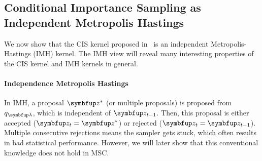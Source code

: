 %
\subsection{Conditional Importance Sampling as Independent Metropolis Hastings}\label{section:cis_imh}
We now show that the CIS kernel proposed in~\citep{NEURIPS2020_b2070693} is an independent Metropolis-Hastings (IMH) kernel.
The IMH view will reveal many interesting properties of the CIS kernel and IMH kernels in general.

\paragraph{Independence Metropolis Hastings}
In IMH, a proposal \(\vz^*\) (or multiple proposals) is proposed from \(q_{\vlambda}\), which is independent of \(\vz_{t-1}\).
Then, this proposal is either accepted (\(\vz_{t} = \vz^*\)) or rejected (\(\vz_{t} = \vz_{t-1}\)).
Multiple consecutive rejections means the sampler gets stuck, which often results in bad statistical performance.
However, we will later show that this conventional knowledge does not hold in MSC.

